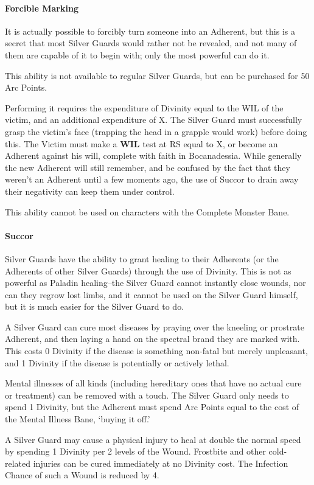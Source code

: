 \documentclass[oneside,11pt,english]{book}
\begin{document}
\paragraph{Forcible Marking}
It is actually possible to forcibly turn someone into an Adherent, but this is a secret that most 
Silver Guards would rather not be revealed, and not many of them are capable of it to begin with; 
only the most powerful can do it. 


This ability is not available to regular Silver Guards, but can be purchased for 50 Arc Points.


Performing it requires the expenditure of Divinity equal to the WIL of the victim, and an 
additional expenditure of X. The Silver Guard must successfully grasp the victim's face (trapping 
the head in a grapple would work) before doing this.
The Victim must make a \textbf{WIL} test at RS equal to X, or become an Adherent against his will, 
complete with faith in Bocanadessia. While generally the new Adherent will still remember, and 
be confused by the fact that they weren't an Adherent until a few moments ago, the use of Succor 
to drain away their negativity can keep them under control. 


This ability cannot be used on characters with the Complete Monster Bane. 
\paragraph{Succor}
Silver Guards have the ability to grant healing to their Adherents (or the Adherents of other Silver 
Guards) through the use of Divinity. This is not as powerful as Paladin healing--the Silver Guard 
cannot instantly close wounds, nor can they regrow lost limbs, and it cannot be used on the Silver 
Guard himself, but it is much easier for the Silver Guard to do. 

A Silver Guard can cure most diseases by praying over the kneeling or prostrate Adherent, and 
then laying a hand on the spectral brand they are marked with. This costs 0 Divinity if the disease 
is something non-fatal but merely unpleasant, and 1 Divinity if the disease is potentially or actively lethal. 

Mental illnesses of all kinds (including hereditary ones that have no actual cure or treatment) can 
be removed with a touch. The Silver Guard only needs to spend 1 Divinity, but the Adherent must 
spend Arc Points equal to the cost of the Mental Illness Bane, ‘buying it off.’ 


A Silver Guard may cause a physical injury to heal at double the normal speed by spending 1 
Divinity per 2 levels of the Wound. Frostbite and other cold-related injuries can be cured 
immediately at no Divinity cost. The Infection Chance of such a Wound is reduced by 4. 
\end{document}
